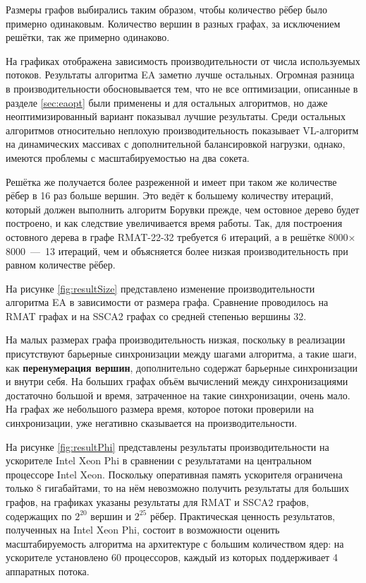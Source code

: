 \documentclass[a4paper,12pt]{extarticle}
\begin{document}
Размеры графов выбирались таким образом, чтобы количество рёбер было примерно одинаковым. Количество вершин в разных графах, за исключением решётки, так же примерно одинаково. 

На графиках отображена зависимость производительности от числа используемых потоков.
Результаты алгоритма EA заметно лучше остальных. Огромная разница в производительности обосновывается тем, что не все оптимизации, описанные в разделе \ref{sec:eaopt} были применены и для остальных алгоритмов, но даже неоптимизированный вариант показывал лучшие результаты.
Среди остальных алгоритмов относительно неплохую производительность показывает VL-алгоритм на динамических массивах с дополнительной балансировкой нагрузки, однако, имеются проблемы с масштабируемостью на два сокета.

Решётка же получается более разреженной и имеет при таком же количестве рёбер в 16 раз больше вершин. 
Это ведёт к большему количеству итераций, который должен выполнить алгоритм Борувки прежде, чем остовное дерево будет построено, и как следствие увеличивается время работы. Так, для построения остовного дерева в графе RMAT-22-32 требуется 6 итераций, а в решётке 8000$\times$8000~---~13 итераций, чем и объясняется более низкая производительность при равном количестве рёбер.




На рисунке \ref{fig:resultSize} представлено изменение производительности алгоритма EA в зависимости от размера графа. Сравнение проводилось на RMAT графах  и на SSCA2 графах со средней степенью вершины 32. 

На малых размерах графа производительность низкая, поскольку в реализации присутствуют барьерные синхронизации между шагами алгоритма, а такие шаги, как \textbf{перенумерация вершин}, дополнительно содержат барьерные синхронизации и внутри себя. На больших графах объём вычислений  между синхронизациями достаточно большой и время, затраченное на такие синхронизации, очень мало. На графах же небольшого размера время, которое потоки проверили на синхронизации, уже негативно сказывается на производительности.


На рисунке \ref{fig:resultPhi} представлены результаты производительности на ускорителе Intel Xeon Phi в сравнении с результатами на центральном процессоре Intel Xeon.
Поскольку оперативная память ускорителя ограничена только 8 гигабайтами, то на нём невозможно получить результаты для больших графов, на графиках указаны результаты для RMAT и SSCA2 графов, содержащих по $2^{20}$ вершин и $2^{25}$ рёбер.
Практическая ценность результатов, полученных на Intel Xeon Phi, состоит в возможности оценить масштабируемость алгоритма на архитектуре с большим количеством ядер: на ускорителе установлено 60 процессоров, каждый из которых поддерживает 4 аппаратных потока.
\end{document}
